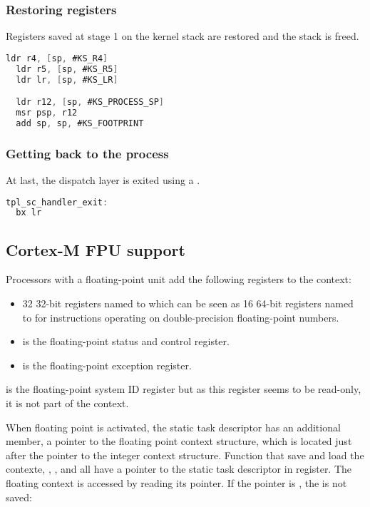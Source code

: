\subsubsection{Restoring registers}

Registers saved at stage 1 on the kernel stack are restored and the stack is freed.

\begin{lstlisting}[language=C]
  ldr r4, [sp, #KS_R4]
  ldr r5, [sp, #KS_R5]
  ldr lr, [sp, #KS_LR]

  ldr r12, [sp, #KS_PROCESS_SP]
  msr psp, r12
  add sp, sp, #KS_FOOTPRINT	
\end{lstlisting}

\subsubsection{Getting back to the process}

At last, the dispatch layer is exited using a .

\begin{lstlisting}[language=C]
tpl_sc_handler_exit:
  bx lr
\end{lstlisting}

\subsection{Cortex-M FPU support}

Processors with a floating-point unit add the following registers to the context:
\begin{itemize}
\item 32 32-bit registers named  to  which can be seen as 16 64-bit registers named  to  for instructions operating on double-precision floating-point numbers.
\item {} is the floating-point status and control register.
\item {} is the floating-point exception register.
\end{itemize}

 is the floating-point system ID register but as this register seems to be read-only, it is not part of the context.

When floating point is activated, the static task descriptor has an additional member, a pointer to the floating point context structure, which is located just after the pointer to the integer context structure. Function that save and load the contexte, , ,  and  all have a pointer to the static task descriptor in  register. The floating context is accessed by reading its pointer. If the pointer is , the is not saved:

